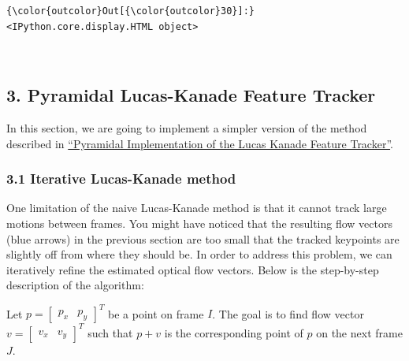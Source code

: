 \documentclass[11pt]{article}
\begin{document}
\begin{Verbatim}[commandchars=\\\{\}]
{\color{outcolor}Out[{\color{outcolor}30}]:} <IPython.core.display.HTML object>
\end{Verbatim}
            
    \begin{center}
    \end{center}
    { \hspace*{\fill} \\}
    
    \hypertarget{pyramidal-lucas-kanade-feature-tracker}{%
\subsection{3. Pyramidal Lucas-Kanade Feature
Tracker}\label{pyramidal-lucas-kanade-feature-tracker}}

In this section, we are going to implement a simpler version of the
method described in
\href{http://citeseerx.ist.psu.edu/viewdoc/download?doi=10.1.1.185.585\&rep=rep1\&type=pdf}{``Pyramidal
Implementation of the Lucas Kanade Feature Tracker''}.

    \hypertarget{iterative-lucas-kanade-method}{%
\subsubsection{3.1 Iterative Lucas-Kanade
method}\label{iterative-lucas-kanade-method}}

One limitation of the naive Lucas-Kanade method is that it cannot track
large motions between frames. You might have noticed that the resulting
flow vectors (blue arrows) in the previous section are too small that
the tracked keypoints are slightly off from where they should be. In
order to address this problem, we can iteratively refine the estimated
optical flow vectors. Below is the step-by-step description of the
algorithm:

Let \(p=\begin{bmatrix}p_x & p_y \end{bmatrix}^T\) be a point on frame
\(I\). The goal is to find flow vector
\(v=\begin{bmatrix}v_x & v_y \end{bmatrix}^T\) such that \(p+v\) is the
corresponding point of \(p\) on the next frame \(J\).
\end{document}
